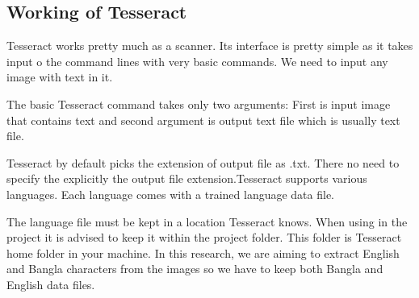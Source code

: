 \subsection{Working of Tesseract}
Tesseract works pretty much as a scanner. Its interface is pretty simple as it takes input o the command lines with very basic commands. We need to input any image with text in it.

The basic Tesseract command takes only two arguments: First is input image that contains text and second argument is output text file which is usually text file.

Tesseract by default picks the extension of output file as .txt. There no need to specify the explicitly the output file extension.Tesseract supports various languages. Each language comes with a trained language data file.

The language file must be kept in a location Tesseract knows. When using in the project it is advised to keep it within the project folder. This folder is Tesseract home folder in your machine. In this research, we are aiming to extract English and Bangla characters from the images so we have to keep both Bangla and English data files.
 
